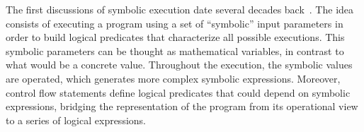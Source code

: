 




The first discussions of symbolic execution date several decades back~\cite{Hoare1969,King1976}. The idea consists of executing a program using a set of ``symbolic'' input parameters in order to build logical predicates that characterize all possible executions. This symbolic parameters can be thought as mathematical variables, in contrast to what would be a concrete value. Throughout the execution, the symbolic values are operated, which generates more complex symbolic expressions. Moreover, control flow statements define logical predicates that could depend on symbolic expressions, bridging the representation of the program from its operational view to a series of logical expressions. %

